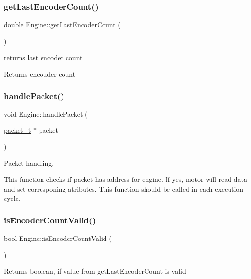\subsubsection{\texorpdfstring{get\+Last\+Encoder\+Count()}{getLastEncoderCount()}}
{\footnotesize\ttfamily double Engine\+::get\+Last\+Encoder\+Count (\begin{DoxyParamCaption}{ }\end{DoxyParamCaption})}



returns last encoder count 

\begin{DoxyReturn}{Returns}
encouder count 
\end{DoxyReturn}
\mbox{\label{classEngine_ab531b7c3575d1e979642e17b2b861416}} 
\subsubsection{\texorpdfstring{handle\+Packet()}{handlePacket()}}
{\footnotesize\ttfamily void Engine\+::handle\+Packet (\begin{DoxyParamCaption}\item[{\hyperlink{structpacket__t}{packet\+\_\+t} $\ast$}]{packet }\end{DoxyParamCaption})}



Packet handling. 

This function checks if packet has address for engine. If yes, motor will read data and set corresponing atributes. This function should be called in each execution cycle. \mbox{\label{classEngine_a59e303aa687c5f97bc6c2c4c93c373a5}} 
\subsubsection{\texorpdfstring{is\+Encoder\+Count\+Valid()}{isEncoderCountValid()}}
{\footnotesize\ttfamily bool Engine\+::is\+Encoder\+Count\+Valid (\begin{DoxyParamCaption}{ }\end{DoxyParamCaption})}

\begin{DoxyReturn}{Returns}
boolean, if value from get\+Last\+Encoder\+Count is valid 
\end{DoxyReturn}
\mbox{\label{classEngine_a580259b41fb482c17c854a07a38ccbd4}} 

